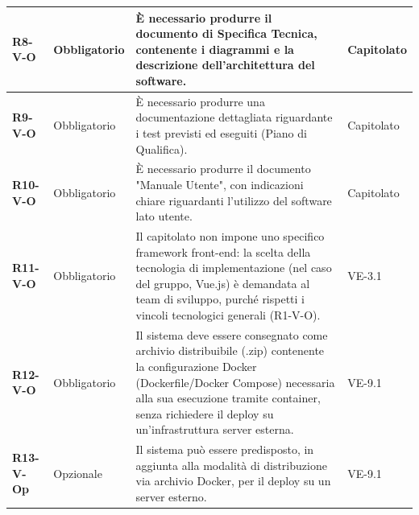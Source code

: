 \begin{longtable}{|p{2.5cm}|p{2.2cm}|p{6.8cm}|p{2.7cm}|}
	\textbf{R8-V-O} & Obbligatorio & È necessario produrre il documento di Specifica Tecnica, contenente i diagrammi e la descrizione dell'architettura del software. & Capitolato \\ \hline
	\textbf{R9-V-O} & Obbligatorio & È necessario produrre una documentazione dettagliata riguardante i test previsti ed eseguiti (Piano di Qualifica). & Capitolato \\ \hline
	\textbf{R10-V-O} & Obbligatorio & È necessario produrre il documento "Manuale Utente", con indicazioni chiare riguardanti l'utilizzo del software lato utente. & Capitolato \\ \hline

	\textbf{R11-V-O} & Obbligatorio & Il capitolato non impone uno specifico framework front-end: la scelta della tecnologia di implementazione (nel caso del gruppo, Vue.js) è demandata al team di sviluppo, purché rispetti i vincoli tecnologici generali (R1-V-O). & VE-3.1 \\ \hline
	\textbf{R12-V-O} & Obbligatorio & Il sistema deve essere consegnato come archivio distribuibile (.zip) contenente la configurazione Docker (Dockerfile/Docker Compose) necessaria alla sua esecuzione tramite container, senza richiedere il deploy su un'infrastruttura server esterna. & VE-9.1 \\ \hline
	\textbf{R13-V-Op} & Opzionale & Il sistema può essere predisposto, in aggiunta alla modalità di distribuzione via archivio Docker, per il deploy su un server esterno. & VE-9.1 \\ \hline

\end{longtable}

